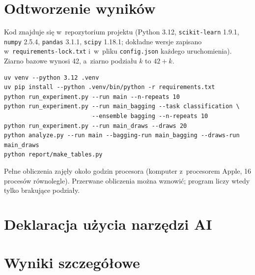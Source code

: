 \documentclass[11pt,a4paper]{article}
\begin{document}
\section{Odtworzenie wyników}

Kod znajduje się w~repozytorium projektu (Python 3.12, \texttt{scikit-learn} 1.9.1, \texttt{numpy} 2.5.4, \texttt{pandas} 3.1.1, \texttt{scipy} 1.18.1; dokładne wersje zapisano w~\texttt{requirements-lock.txt} i~w~pliku \texttt{config.json} każdego uruchomienia). Ziarno bazowe wynosi 42, a~ziarno podziału $k$ to $42+k$.

\begin{verbatim}
uv venv --python 3.12 .venv
uv pip install --python .venv/bin/python -r requirements.txt
python run_experiment.py --run main --n-repeats 10
python run_experiment.py --run main_bagging --task classification \
                         --ensemble bagging --n-repeats 10
python run_experiment.py --run main_draws --draws 20
python analyze.py --run main --bagging-run main_bagging --draws-run main_draws
python report/make_tables.py
\end{verbatim}
Pełne obliczenia zajęły około \unskip{} godzin procesora (komputer z~procesorem Apple, 16 procesów równolegle). Przerwane obliczenia można wznowić; program liczy wtedy tylko brakujące podziały.

\section{Deklaracja użycia narzędzi AI}






\clearpage
\appendix
\section{Wyniki szczegółowe}
\label{app:szczegoly}


\end{document}
